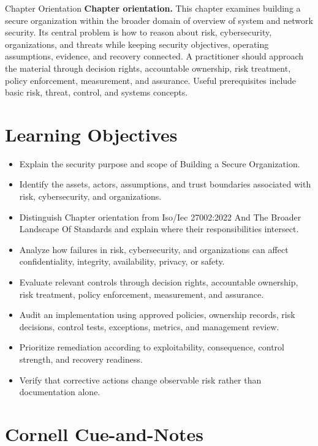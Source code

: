\documentclass[11pt,letterpaper]{article}
\title{\CornellDocumentTitle}
\author{}
\date{}
\begin{document}
\maketitle
\begin{CornellOverviewBox}{Chapter Orientation}
\textbf{Chapter orientation.} This chapter examines building a secure organization within the broader domain of overview of system and network security. Its central problem is how to reason about risk, cybersecurity, organizations, and threats while keeping security objectives, operating assumptions, evidence, and recovery connected. A practitioner should approach the material through decision rights, accountable ownership, risk treatment, policy enforcement, measurement, and assurance. Useful prerequisites include basic risk, threat, control, and systems concepts.
\end{CornellOverviewBox}
\section*{Learning Objectives}
\begin{itemize}
\item Explain the security purpose and scope of Building a Secure Organization.
\item Identify the assets, actors, assumptions, and trust boundaries associated with risk, cybersecurity, and organizations.
\item Distinguish Chapter orientation from Iso/Iec 27002:2022 And The Broader Landscape Of Standards and explain where their responsibilities intersect.
\item Analyze how failures in risk, cybersecurity, and organizations can affect confidentiality, integrity, availability, privacy, or safety.
\item Evaluate relevant controls through decision rights, accountable ownership, risk treatment, policy enforcement, measurement, and assurance.
\item Audit an implementation using approved policies, ownership records, risk decisions, control tests, exceptions, metrics, and management review.
\item Prioritize remediation according to exploitability, consequence, control strength, and recovery readiness.
\item Verify that corrective actions change observable risk rather than documentation alone.
\end{itemize}
\section*{Cornell Cue-and-Notes}
\end{document}
